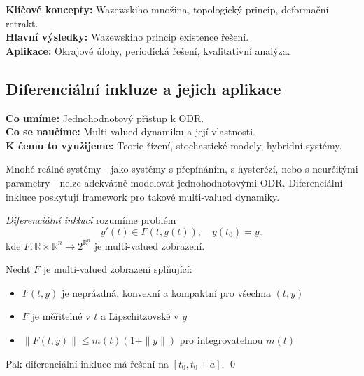 \begin{summary}
\textbf{Klíčové koncepty:} Wazewskiho množina, topologický princip, deformační retrakt. \\
\textbf{Hlavní výsledky:} Wazewskiho princip existence řešení. \\
\textbf{Aplikace:} Okrajové úlohy, periodická řešení, kvalitativní analýza.
\end{summary}

\spc

\subsection{Diferenciální inkluze a jejich aplikace}

\begin{scaffold}
\textbf{Co umíme:} Jednohodnotový přístup k ODR. \\
\textbf{Co se naučíme:} Multi-valued dynamiku a její vlastnosti. \\
\textbf{K čemu to využijeme:} Teorie řízení, stochastické modely, hybridní systémy.
\end{scaffold}

\begin{motivation}
Mnohé reálné systémy - jako systémy s přepínáním, s hysterézí, nebo s neurčitými parametry - nelze adekvátně modelovat jednohodnotovými ODR. Diferenciální inkluce poskytují framework pro takové multi-valued dynamiky.
\end{motivation}

\begin{definition}
\emph{Diferenciální inklucí} rozumíme problém
\[
y'(t) \in F(t, y(t)), \quad y(t_0) = y_0
\]
kde $F: \mathbb{R} \times \mathbb{R}^n \to 2^{\mathbb{R}^n}$ je multi-valued zobrazení.
\end{definition}

\begin{theorem}
Nechť $F$ je multi-valued zobrazení splňující:
\begin{itemize}
\item $F(t,y)$ je neprázdná, konvexní a kompaktní pro všechna $(t,y)$
\item $F$ je měřitelné v $t$ a Lipschitzovské v $y$
\item $\|F(t,y)\| \leq m(t)(1 + \|y\|)$ pro integrovatelnou $m(t)$
\end{itemize}
Pak diferenciální inkluce má řešení na $[t_0, t_0+a]$.
\qed
\end{theorem}

